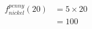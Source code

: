 \vbox{
  \begin{align*}
    f_{nickel}^{penny}(20)  & = 5 \times 20 \\
                            & = 100
  \end{align*}
}
